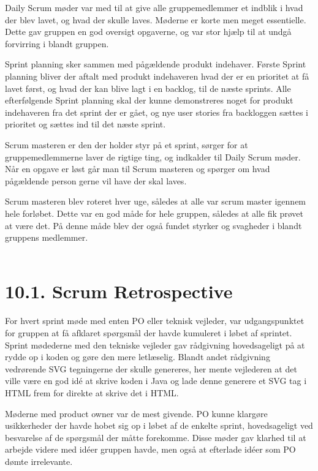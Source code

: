 \documentclass[11pt]{report}
\begin{document}
Daily Scrum møder var med til at give alle gruppemedlemmer et indblik i hvad der blev lavet, og hvad der skulle laves. Møderne er korte men meget essentielle. Dette gav gruppen en god oversigt opgaverne, og var stor hjælp til at undgå forvirring i blandt gruppen. 

Sprint planning sker sammen med pågældende produkt indehaver. Første Sprint planning bliver der aftalt med produkt indehaveren hvad der er en prioritet at få lavet først, og hvad der kan blive lagt i en backlog, til de næste sprints. Alle efterfølgende Sprint planning skal der kunne demonstreres noget for produkt indehaveren fra det sprint der er gået, og nye user stories fra backloggen sættes i prioritet og sættes ind til det næste sprint. 

Scrum masteren er den der holder styr på et sprint, sørger for at gruppemedlemmerne laver de rigtige ting, og indkalder til Daily Scrum møder. Når en opgave er løst går man til Scrum masteren og spørger om hvad pågældende person gerne vil have der skal laves. 

Scrum masteren blev roteret hver uge, således at alle var scrum master igennem hele forløbet. Dette var en god måde for hele gruppen, således at alle fik prøvet at være det. På denne måde blev der også fundet styrker og svagheder i blandt gruppens medlemmer. \\\\

\section*{10.1. Scrum Retrospective}
For hvert sprint møde med enten PO eller teknisk vejleder, var udgangspunktet for gruppen at få afklaret spørgsmål der havde kumuleret i løbet af sprintet.
Sprint mødederne med den tekniske vejleder gav rådgivning hovedsageligt på at rydde op i koden og gøre den mere letlæselig. Blandt andet rådgivning vedrørende SVG tegningerne der skulle genereres, her mente vejlederen at det ville være en god idé at skrive koden i Java og lade denne generere et SVG tag i HTML frem for direkte at skrive det i HTML.

Møderne med product owner var de mest givende. PO kunne klargøre
usikkerheder der havde hobet sig op i løbet af de enkelte sprint,
hovedsageligt ved besvarelse af de spørgsmål der måtte
forekomme. Disse møder gav klarhed til at arbejde videre med idéer
gruppen havde, men også at efterlade idéer som PO dømte irrelevante. \\\\
\end{document}
